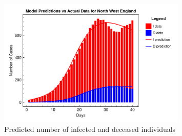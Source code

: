 \documentclass[12pt]{article}
\begin{document}
\begin{figure}
    \centering
    \includegraphics[width=0.8\textwidth]{images/ude/North West England_infected_death_data.pdf}
    \caption{Predicted number of infected and deceased individuals}
    \label{fig:ude_North West England}
\end{figure}
\end{document}
